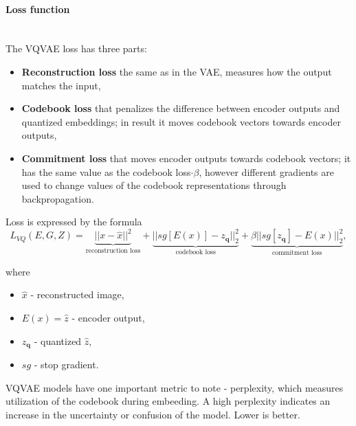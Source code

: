 
\paragraph{Loss function}\mbox{}\\
The VQVAE loss has three parts:

\begin{itemize}
    \item \textbf{Reconstruction loss} the same as in the VAE, measures how the output matches the input,
    \item \textbf{Codebook loss} that penalizes the difference between encoder outputs and quantized embeddings; in result it moves codebook vectors towards encoder outputs, 
    \item \textbf{Commitment loss} that moves encoder outputs towards codebook vectors; it has the same value as the codebook loss$\cdot\beta$, however different gradients are used to change values of the codebook representations through backpropagation.
\end{itemize}

Loss is expressed by the formula
\begin{equation}
    L_{VQ}(E, G, Z) = \underbrace{||x-\hat{x}||^{2}}_{\text{reconstruction loss}} + \underbrace{||sg[E(x)] - z_\mathbf{q}||_2^2}_{\text{codebook loss}}
+ \underbrace{\beta||sg[z_\mathbf{q}] - E(x) ||_{2}^2}_{\text{commitment loss}},
    \label{loss_vq}
\end{equation}

where
\begin{itemize}
    \item $\hat{x}$ - reconstructed image,
    \item $E(x)=\hat{z}$ - encoder output,
    \item $z_\mathbf{q}$ - quantized $\hat{z}$,
    \item $sg$ - stop gradient.
\end{itemize}

VQVAE models have one important metric to note - perplexity, which measures utilization of the codebook during embeeding. A high perplexity indicates an increase in the uncertainty or confusion of the model. Lower is better.

